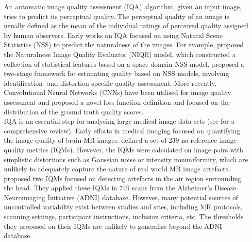 \documentclass[preprint,12pt,authoryear]{elsarticle}
\begin{document}
An automatic image quality assessment (IQA) algorithm, given an input image, tries to predict its perceptual quality. The perceptual quality of an image is usually defined as the mean of the individual ratings of perceived quality assigned by human observers.
Early works on IQA focused on using Natural Scene Statistics (NSS) to predict the naturalness of the images. For example, \cite{Mittal2013} proposed the Naturalness Image Quality Evaluator (NIQE) model, which constructed a collection of statistical features based on a space domain NSS model.
\cite{Moorthy2011} proposed a two-stage framework for estimating quality based on NSS models, involving identification- and distortion-specific quality assessment. More recently, Convolutional Neural Networks (CNNs) have been utilised for image quality assessment \citep{Kang2014} and \cite{Talebi2018} proposed a novel loss function definition and focused on the distribution of the ground truth quality scores.\\


IQA is an essential step for analysing large medical image data sets (see \cite{Chow2016} for a comprehensive review). Early efforts in medical imaging focused on quantifying the image quality of brain MR images. \cite{Woodard2006} defined a set of 239 no-reference image-quality metrics (IQMs). However, the IQMs were calculated on image pairs with simplistic distortions such as Gaussian  noise  or  intensity  nonuniformity, which are unlikely to adequately capture the nature of real world MR image artefacts. \cite{Mortamet2009}  proposed two IQMs focused on detecting artefacts in the air region surrounding the head. They applied these IQMs in 749 scans from the Alzheimer’s Disease Neuroimaging Initiative (ADNI) database. However, many potential sources of uncontrolled variability exist between studies and sites, including MR protocols, scanning settings, participant instructions, inclusion criteria, etc. The thresholds they proposed on their IQMs are unlikely to generalise beyond the ADNI database.\\
\end{document}
